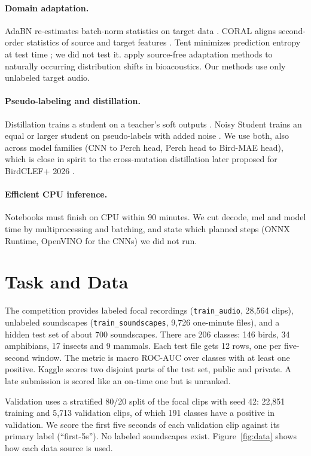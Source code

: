\documentclass[letterpaper]{article} %
\begin{document}
\paragraph{Domain adaptation.}
AdaBN re-estimates batch-norm statistics on target data \citep{li2018adaptive}. CORAL aligns second-order statistics of source and target features \citep{sun2016return}. Tent minimizes prediction entropy at test time \citep{wang2021tent}; we did not test it. \citet{boudiaf2023search} apply source-free adaptation methods to naturally occurring distribution shifts in bioacoustics. Our methods use only unlabeled target audio.

\paragraph{Pseudo-labeling and distillation.}
Distillation trains a student on a teacher's soft outputs \citep{hinton2015distilling}. Noisy Student trains an equal or larger student on pseudo-labels with added noise \citep{xie2020selftraining}. We use both, also across model families (CNN to Perch head, Perch head to Bird-MAE head), which is close in spirit to the cross-mutation distillation later proposed for BirdCLEF+ 2026 \citep{farazi2026crossmutated}.

\paragraph{Efficient CPU inference.}
Notebooks must finish on CPU within 90 minutes. We cut decode, mel and model time by multiprocessing and batching, and state which planned steps (ONNX Runtime, OpenVINO for the CNNs) we did not run.

\section{Task and Data}
The competition provides labeled focal recordings (\texttt{train\_audio}, 28,564 clips), unlabeled soundscapes (\texttt{train\_soundscapes}, 9,726 one-minute files), and a hidden test set of about 700 soundscapes. There are 206 classes: 146 birds, 34 amphibians, 17 insects and 9 mammals. Each test file gets 12 rows, one per five-second window. The metric is macro ROC-AUC over classes with at least one positive. Kaggle scores two disjoint parts of the test set, public and private. A late submission is scored like an on-time one but is unranked.

Validation uses a stratified 80/20 split of the focal clips with seed 42: 22,851 training and 5,713 validation clips, of which 191 classes have a positive in validation. We score the first five seconds of each validation clip against its primary label (``first-5s''). No labeled soundscapes exist. Figure~\ref{fig:data} shows how each data source is used.
\end{document}
